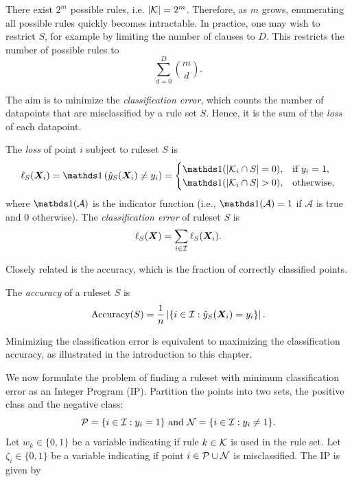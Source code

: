 There exist $2^m$ possible rules, i.e. $|\mathcal{K}| = 2^m$.
Therefore, as $m$ grows, enumerating all possible rules quickly becomes intractable.
In practice, one may wish to restrict $S$, for example by limiting the number of clauses to $D$.
This restricts the number of possible rules to \[\sum_{d=0}^D \binom{m}{d}.\]


The aim is to minimize the \emph{\zo classification error}, which counts the number of datapoints that are misclassified by a rule set $S$.
Hence, it is the sum of the \emph{\zo loss} of each datapoint.

\begin{definition}\label{def:01_loss}
    The \emph{\zo loss} of point $i$ subject to ruleset $S$ is
    \[\ell_S(\bm{X}_i) = \Ind\left(\hat{y}_S(\bm{X}_i) \neq y_i\right) =
    \begin{cases}
        \Ind(\abs{\K_i \cap S }= 0), & \text{if } y_i = 1,\\
        \Ind(\abs{\K_i \cap S} > 0), &\text{otherwise},
    \end{cases}\]
    where $\Ind(\mathcal{A})$ is the indicator function (i.e., $\Ind(\mathcal{A}) = 1$ if $\mathcal{A}$ is true and 0 otherwise).
The \emph{\zo classification error} of ruleset $S$ is
    \[\ell_S(\bm{X}) =
    \sum_{i \in \mathcal{I}} \ell_S(\bm{X}_i). \]
\end{definition}
Closely related is the accuracy, which is the fraction of correctly classified points.
\begin{definition}[Accuracy]
    The \emph{accuracy} of a ruleset $S$ is
    \[
        \text{Accuracy}(S) = \frac{1}{n}\left|\left\{i \in \mathcal{I} : \hat{y}_S(\bm{X}_i) = y_i\right\}\right|.
    \]
\end{definition}
Minimizing the \zo classification error is equivalent to maximizing the classification accuracy, as illustrated in
the introduction to this chapter.


We now formulate the problem of finding a ruleset with minimum \zo classification error as an Integer Program (IP).
Partition the points into two sets, the positive class and the negative class:
\[\mathcal{P} = \{i \in \mathcal{I} : y_i = 1\} \text{ and } \mathcal{N} = \{i \in \mathcal{I} : y_i \neq 1\}.\]
Let $w_k \in \{0,1\}$ be a variable indicating if rule $k \in \mathcal{K}$ is used in the rule set.
Let $\zeta_i\in\{0,1\}$  be a variable indicating if point $i\in \mathcal{P} \cup \mathcal{N}$ is misclassified.
The IP is given by



